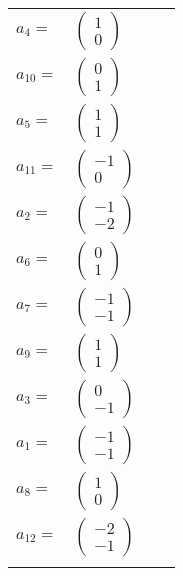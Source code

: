 \documentclass[1p]{elsarticle_modified}
\theoremstyle{definition}
\begin{document}
\begin{tabular}{m{7pt} m{180pt} m{7pt} m{180pt} }
\flushright $a_{4}=$&$\begin{pmatrix}1\\0\end{pmatrix}$ \\
\flushright $a_{10}=$&$\begin{pmatrix}0\\1\end{pmatrix}$ \\
\flushright $a_{5}=$&$\begin{pmatrix}1\\1\end{pmatrix}$ \\
\flushright $a_{11}=$&$\begin{pmatrix}-1\\0\end{pmatrix}$ \\
\flushright $a_{2}=$&$\begin{pmatrix}-1\\-2\end{pmatrix}$ \\
\flushright $a_{6}=$&$\begin{pmatrix}0\\1\end{pmatrix}$ \\
\flushright $a_{7}=$&$\begin{pmatrix}-1\\-1\end{pmatrix}$ \\
\flushright $a_{9}=$&$\begin{pmatrix}1\\1\end{pmatrix}$ \\
\flushright $a_{3}=$&$\begin{pmatrix}0\\-1\end{pmatrix}$ \\
\flushright $a_{1}=$&$\begin{pmatrix}-1\\-1\end{pmatrix}$ \\
\flushright $a_{8}=$&$\begin{pmatrix}1\\0\end{pmatrix}$ \\
\flushright $a_{12}=$&$\begin{pmatrix}-2\\-1\end{pmatrix}$\\&\end{tabular}
\end{document}
